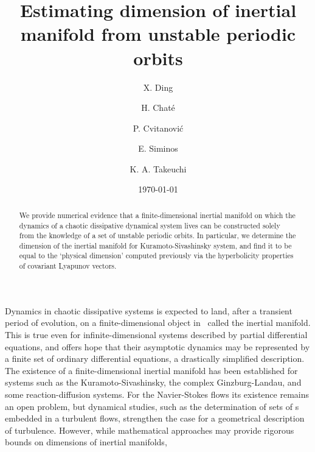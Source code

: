 \documentclass[prl,aps,preprint,showpacs,superscriptaddress]{revtex4-1} %
\begin{document}
        \title{
Estimating dimension of inertial manifold from unstable periodic orbits
        }

\author{X. Ding}
\author{H. Chat\'e}
%
%
\author{P. Cvitanovi\'c}
\author{E. Siminos}
\author{K. A. Takeuchi}
%


\date{\today}

\begin{abstract}
We provide numerical evidence that a finite-dimensional inertial manifold
on which the dynamics of a chaotic dissipative dynamical system lives can
be constructed solely from the knowledge of a set of unstable
periodic orbits. In particular, we determine the dimension of the
inertial manifold for Kuramoto-Sivashinsky system, and find it to be
equal to the `physical dimension' computed previously via the
hyperbolicity properties of covariant Lyapunov vectors.
\end{abstract}



\maketitle

Dynamics in chaotic dissipative systems is expected to land, after a
transient period of evolution, on a finite-dimensional object in
\statesp\ called the inertial
manifold.
This is true even for infinite-dimensional systems described by partial
differential equations, and offers hope that their asymptotic dynamics
may be represented by a finite set of ordinary differential equations, a
drastically simplified description. The existence of a finite-dimensional
inertial manifold has been established for systems such as the
Kuramoto-Sivashinsky, the complex Ginzburg-Landau, and some reaction-diffusion
systems. For the Navier-Stokes flows its
existence remains an open problem,
but dynamical studies, such as the determination of sets of \po s embedded in
a turbulent flows, strengthen the case for a geometrical
description of turbulence. However, while mathematical approaches
may provide rigorous bounds on dimensions of inertial manifolds, 
\end{document}
